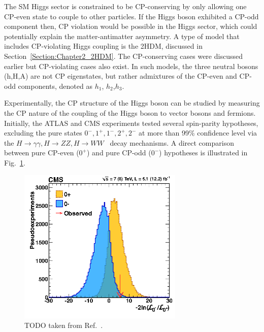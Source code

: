 The SM Higgs sector is constrained to be CP-conserving by only allowing one CP-even state to couple to other particles. If the Higgs boson exhibited a CP-odd component then, CP violation would be possible in the Higgs sector, which could potentially explain the matter-antimatter asymmetry. A type of model that includes CP-violating Higgs coupling is the 2HDM, discussed in Section~\ref{Section:Chapter2_2HDM}. The CP-conserving cases were discussed earlier but CP-violating cases also exist. In such models, the three neutral bosons (h,H,A) are not CP eigenstates, but rather admixtures of the CP-even and CP-odd components, denoted as $h_1$, $h_2$,$h_3$.

Experimentally, the CP structure of the Higgs boson can be studied by measuring the CP nature of the coupling of the Higgs boson to vector bosons and fermions. Initially, the ATLAS and CMS experiments tested several spin-parity hypotheses, excluding the pure states $0^-,1^+,1^-,2^+,2^-$ at more than 99\% confidence level via the $H\to \gamma\gamma, H\to ZZ, H\to WW$~\cite{CP_constraints_1,CP_constraints_2,CP_constraints_3} decay mechanisms. A direct comparison between pure CP-even ($0^+$) and pure CP-odd ($0^-$) hypotheses is illustrated in Fig.~\ref{Figure:Chapter2_CPevenVsCPodd}. 

\begin{figure}[h]
\centering
\includegraphics[width= 0.7\textwidth]{Figures/Chapter2/SpinParity.png}
\caption{TODO taken from Ref.~\cite{CP_constraints_2}.}
\label{Figure:Chapter2_CPevenVsCPodd}
\end{figure}

